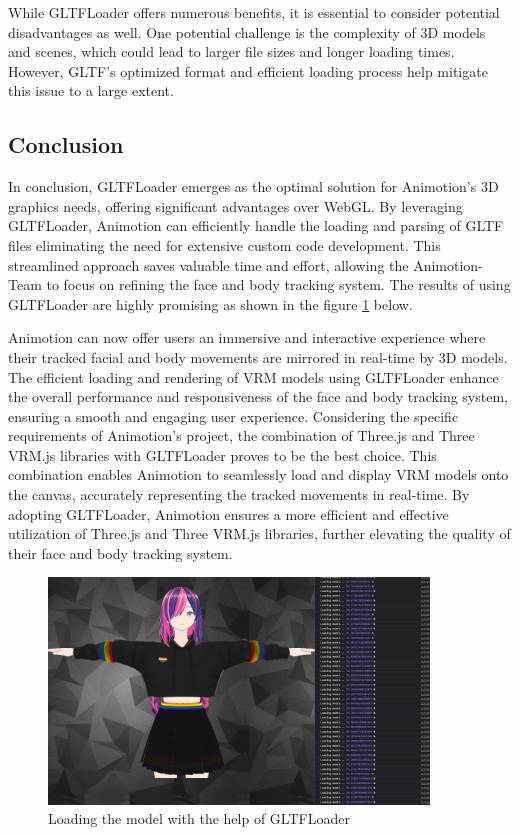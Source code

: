 While GLTFLoader offers numerous benefits, it is essential to consider potential disadvantages as well. 
One potential challenge is the complexity of 3D models and scenes, which could lead to larger file sizes 
and longer loading times. However, GLTF's optimized format and efficient loading process help mitigate this issue to a large extent.

\subsection{Conclusion}
In conclusion, GLTFLoader emerges as the optimal solution for Animotion's 3D graphics needs, 
offering significant advantages over WebGL. By leveraging GLTFLoader, Animotion can efficiently 
handle the loading and parsing of GLTF files
eliminating the need for extensive custom code development. This streamlined approach saves valuable 
time and effort, allowing the Animotion-Team to focus on refining the face and body tracking system.
The results of using GLTFLoader are highly promising as shown in the figure \ref{fig:gltfloader} below. 

Animotion can now offer users an immersive and 
interactive experience where their tracked facial and body movements are mirrored in real-time by 3D models. 
The efficient loading and rendering of VRM models using GLTFLoader enhance the overall performance and 
responsiveness of the face and body tracking system, ensuring a smooth and engaging user experience.
Considering the specific requirements of Animotion's project, the combination of Three.js and Three VRM.js 
libraries with GLTFLoader proves to be the best choice. This combination enables Animotion to seamlessly 
load and display VRM models onto the canvas, accurately representing the tracked movements in real-time. 
By adopting GLTFLoader, Animotion ensures a more efficient and effective utilization of Three.js 
and Three VRM.js libraries, further elevating the quality of their face and body tracking system.
\\
\begin{figure}[htb]
    \centering
    \includegraphics[width=0.9\textwidth]{pics/GLTFLoader.png}
    \caption{Loading the model with the help of GLTFLoader}
    \label{fig:gltfloader}
\end{figure}
\newpage
